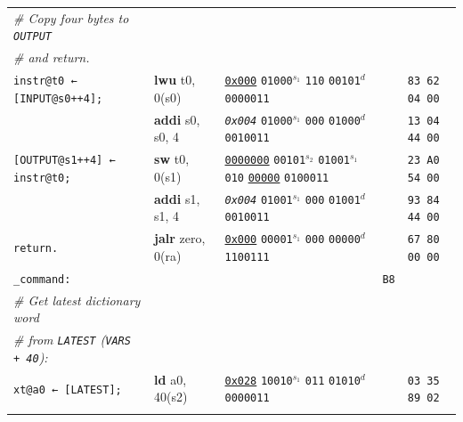 \documentclass[a4paper,12pt,final]{article}
\begin{document}
\begin{table}[!htbp]
\begin{adjustwidth}{-1cm}{-1cm}
\begin{center}
\begin{tabular}{l|ll|l|l}
\hspace{1em} \emph{\# Copy four bytes to \texttt{OUTPUT}} &  &  &  & \\[0pt]
\hspace{1em} \emph{\# and return.} &  &  &  & \\[0pt]
\hspace{1em} \texttt{instr@t0 ← [INPUT@s0++4];} & \textbf{lwu} t0, 0(s0) & \uline{\texttt{0x000}}                    \texttt{01000}​\(^{s_{1}}\) \texttt{110} \texttt{00101}​\(^{d}\)  \texttt{0000011} &  & \texttt{83 62 04 00}\\[0pt]
\hspace{1em} & \textbf{addi} s0, s0, 4 & \emph{\texttt{0x004}}                    \texttt{01000}​\(^{s_{1}}\) \texttt{000} \texttt{01000}​\(^{d}\)  \texttt{0010011} &  & \texttt{13 04 44 00}\\[0pt]
\hspace{1em} \texttt{[OUTPUT@s1++4] ← instr@t0;} & \textbf{sw} t0, 0(s1) & \uline{\texttt{0000000}} \texttt{00101}​\(^{s_{2}}\) \texttt{01001}​\(^{s_{1}}\) \texttt{010} \uline{\texttt{00000}} \texttt{0100011} &  & \texttt{23 A0 54 00}\\[0pt]
\hspace{1em} & \textbf{addi} s1, s1, 4 & \emph{\texttt{0x004}}                    \texttt{01001}​\(^{s_{1}}\) \texttt{000} \texttt{01001}​\(^{d}\)  \texttt{0010011} &  & \texttt{93 84 44 00}\\[0pt]
\hspace{1em} \texttt{return.} & \textbf{jalr} zero, 0(ra) & \uline{\texttt{0x000}}                    \texttt{00001}​\(^{s_{1}}\) \texttt{000} \texttt{00000}​\(^{d}\)  \texttt{1100111} &  & \texttt{67 80 00 00}\\[0pt]
\texttt{\_command:} &  &  & \texttt{B8} & \\[0pt]
\hspace{1em} \emph{\# Get latest dictionary word} &  &  &  & \\[0pt]
\hspace{1em} \emph{\# from \texttt{LATEST} (\texttt{VARS + 40}):} &  &  &  & \\[0pt]
\hspace{1em} \texttt{xt@a0 ← [LATEST];} & \textbf{ld} a0, 40(s2) & \uline{\texttt{0x028}}                    \texttt{10010}​\(^{s_{1}}\) \texttt{011} \texttt{01010}​\(^{d}\)  \texttt{0000011} &  & \texttt{03 35 89 02}\\[0pt]
\hspace{1em} &  &  &  & \\[0pt]

\end{tabular}
\end{center}
\end{adjustwidth}
\end{table}
\end{document}
